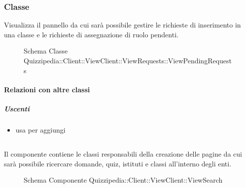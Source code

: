 \subsubsection{Classe }
Visualizza il pannello da cui sarà possibile gestire le richieste di inserimento in una classe e le richieste di assegnazione di ruolo pendenti.
\begin{figure}[H]
\centering
\noindent{}
\caption[Schema Classe ViewPendingRequests]{Schema Classe Quizzipedia::Client::ViewClient::ViewRequests::ViewPendingRequests}
\end{figure}
\paragraph{Relazioni con altre classi}
\subparagraph{Uscenti}
\begin{itemize}
\item usa  per aggiungi
\end{itemize}
\subsection{}
Il componente contiene le classi responsabili della creazione delle pagine da cui sarà possibile ricercare domande, quiz, istituti e classi all'interno degli enti.
\begin{figure}[H]
\centering
\noindent{}
\caption[Schema Componente Quizzipedia::Client::ViewClient::ViewSearch]{Schema Componente Quizzipedia::Client::ViewClient::ViewSearch}
\end{figure}
